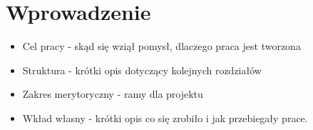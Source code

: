 \chapter{Wprowadzenie}
\label{cha:rozdzial1}

\begin{itemize}
\item Cel pracy - skąd się wziął pomysł, dlaczego praca jest tworzona
\item Struktura - krótki opis dotyczący kolejnych rozdziałów
\item Zakres merytoryczny - ramy dla projektu
\item Wkład własny - krótki opis co się zrobiło i jak przebiegały prace.
\end{itemize}